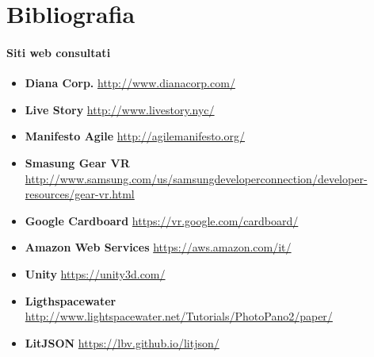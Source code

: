\newpage

\cleardoublepage
\appendix


\chapter{Bibliografia}

\subsubsection{Siti web consultati}

\begin{itemize}
	\item \textbf{Diana Corp.}	\url{http://www.dianacorp.com/}
	\item \textbf{Live Story}	\url{http://www.livestory.nyc/}
	\item \textbf{Manifesto Agile}	\url{http://agilemanifesto.org/}
	\item \textbf{Smasung Gear VR}	\url{http://www.samsung.com/us/samsungdeveloperconnection/developer-resources/gear-vr.html}
	\item \textbf{Google Cardboard}	\url{https://vr.google.com/cardboard/}
	\item \textbf{Amazon Web Services}	\url{https://aws.amazon.com/it/}
	\item \textbf{Unity}	\url{https://unity3d.com/}
	\item \textbf{Ligthspacewater}	\url{http://www.lightspacewater.net/Tutorials/PhotoPano2/paper/}
	\item \textbf{LitJSON}	\url{https://lbv.github.io/litjson/}
\end{itemize}